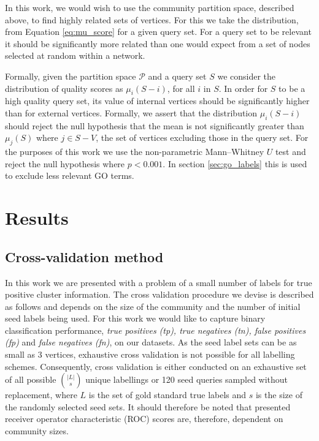 \documentclass[manuscript, proceedings]{acmart}
\begin{document}
In this work, we would wish to use the community partition space, described above, to find highly related sets of vertices.
For this we take the distribution, from Equation \ref{eq:mu_score} for a given query set.
For a query set to be relevant it should be significantly more related than one would expect from a set of nodes selected at random within a network.

Formally, given the partition space $\mathcal{P}$ and a query set $S$ we consider the distribution of quality scores as $\mu_i(S - i)$, for all $i$ in $S$.
In order for $S$ to be a high quality query set, its value of internal vertices should be significantly higher than for external vertices.
Formally, we assert that the distribution $\mu_i(S - i)$ should reject the null hypothesis that the mean is not significantly greater than $\mu_j(S)$ where $j \in S - V$, the set of vertices excluding those in the query set.
For the purposes of this work we use the non-parametric Mann–Whitney $U$ test and reject the null hypothesis where $p < 0.001$.
In section \ref{sec:go_labels} this is used to exclude less relevant GO terms.

\section{Results}
\subsection{Cross-validation method}
\label{sec:cross_validation}
In this work we are presented with a problem of a small number of labels for true positive cluster information.
The cross validation procedure we devise is described as follows and depends on the size of the community and the number of initial seed labels being used.
For this work we would like to capture binary classification  performance, \textit{true positives (tp), true negatives (tn), false positives (fp)} and \textit{false negatives (fn)}, on our datasets.
As the seed label sets can be as small as 3 vertices, exhaustive cross validation is not possible for all labelling schemes.
Consequently, cross validation is either conducted on an exhaustive set of all possible $\binom{|L|}{s}$ unique labellings or 120 seed queries sampled without replacement, where $L$ is the set of gold standard true labels and $s$ is the size of the randomly selected seed sets.
It should therefore be noted that presented receiver operator characteristic (ROC) scores are, therefore, dependent on community sizes.
\end{document}
